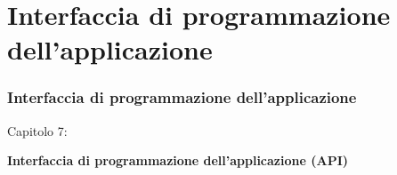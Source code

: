 %

\section{Interfaccia di programmazione dell'applicazione}
\begin{frame}[fragile]
	\frametitle{Interfaccia di programmazione dell'applicazione}

	\begin{center}\huge{Capitolo 7:}\end{center}
	\begin{center}\huge{\color{typo3darkgrey}\textbf{Interfaccia di programmazione dell'applicazione (API)}}\end{center}

\end{frame}


